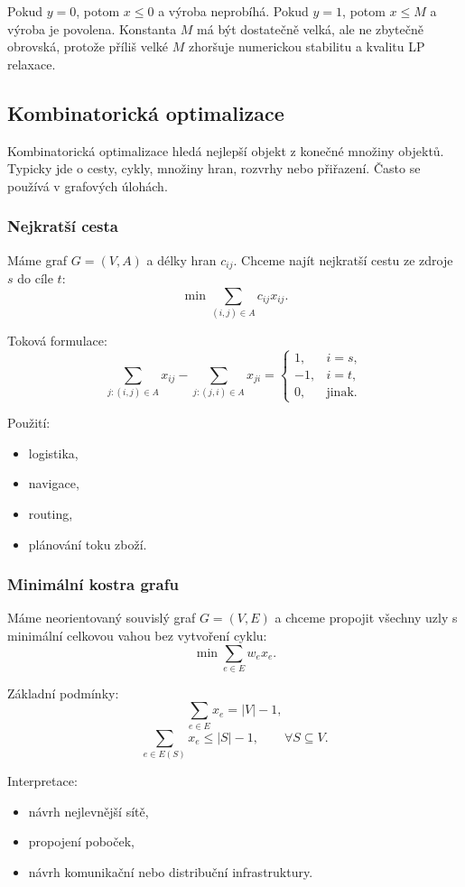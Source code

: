 Pokud $y=0$, potom $x\le 0$ a výroba neprobíhá. Pokud $y=1$, potom $x\le M$ a výroba je povolena.
Konstanta $M$ má být dostatečně velká, ale ne zbytečně obrovská, protože příliš velké $M$ zhoršuje
numerickou stabilitu a kvalitu LP relaxace.

\subsection{Kombinatorická optimalizace}

Kombinatorická optimalizace hledá nejlepší objekt z konečné množiny objektů. Typicky jde o cesty,
cykly, množiny hran, rozvrhy nebo přiřazení. Často se používá v grafových úlohách.

\subsubsection{Nejkratší cesta}

Máme graf $G=(V,A)$ a délky hran $c_{ij}$. Chceme najít nejkratší cestu ze zdroje $s$ do cíle $t$:
\[
\min \sum_{(i,j)\in A} c_{ij}x_{ij}.
\]

Toková formulace:
\[
\sum_{j:(i,j)\in A}x_{ij}
-
\sum_{j:(j,i)\in A}x_{ji}
=
\begin{cases}
1, & i=s,\\
-1, & i=t,\\
0, & \text{jinak.}
\end{cases}
\]

Použití:
\begin{itemize}
    \item logistika,
    \item navigace,
    \item routing,
    \item plánování toku zboží.
\end{itemize}

\subsubsection{Minimální kostra grafu}

Máme neorientovaný souvislý graf $G=(V,E)$ a chceme propojit všechny uzly s minimální celkovou
vahou bez vytvoření cyklu:
\[
\min \sum_{e\in E} w_ex_e.
\]

Základní podmínky:
\[
\sum_{e\in E}x_e=|V|-1,
\]
\[
\sum_{e\in E(S)}x_e\le |S|-1,\qquad \forall S\subseteq V.
\]

Interpretace:
\begin{itemize}
    \item návrh nejlevnější sítě,
    \item propojení poboček,
    \item návrh komunikační nebo distribuční infrastruktury.
\end{itemize}

